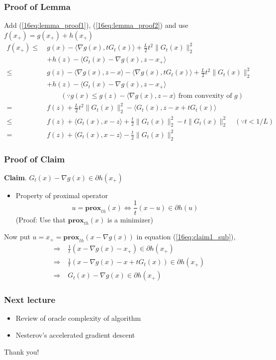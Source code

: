 \documentclass{beamer}
\begin{document}
\begin{frame}
\frametitle{Proof of Lemma}
Add (\ref{16eq:lemma_proof1}), (\ref{16eq:lemma_proof2}) and use $f(x_+)=g(x_+)+h(x_+)$
\begin{align*}
f(x_+) \leq ~&g(x)- \langle \nabla g(x), tG_t(x) \rangle +\frac{L}{2}t^2 \|G_t(x)\|_2^2\\
&+h(z)-\langle G_t(x) -\nabla g(x),z-x_+ \rangle\\
\leq ~&g(z) -\langle \nabla g(x),z-x \rangle - \langle \nabla g(x), tG_t(x) \rangle +\frac{L}{2}t^2 \|G_t(x)\|_2^2\\
&+h(z)-\langle G_t(x) -\nabla g(x),z-x_+ \rangle \\
&\hspace{2em}(\because g(x) \leq g(z)-\langle \nabla g(x),z-x \rangle \text{ from convexity of } g)\\
= ~&f(z)+\frac{L}{2}t^2 \|G_t(x)\|_2^2 - \langle G_t(x),z-x+tG_t(x) \rangle\\
\leq ~&f(z)+\langle G_t (x),x-z \rangle+\frac{t}{2}\|G_t(x)\|_2^2-t \|G_t(x)\|_2^2 \hspace{1em}(\because t<1/L)\\
= ~&f(z)+\langle G_t (x),x-z \rangle-\frac{t}{2}\|G_t(x)\|_2^2
\end{align*}
\end{frame}

\begin{frame}
\frametitle{Proof of Claim}
\textbf{Claim}. $G_t(x)-\nabla g(x) \in \partial h(x_+)$\\
\begin{itemize}
\item Property of proximal operator\\
\begin{equation}\label{16eq:claim1_sub}
u=\textbf{prox}_{th}(x) \Leftrightarrow \frac{1}{t}(x-u) \in \partial h(u)
\end{equation}
(Proof: Use that $\textbf{prox}_{th}(x)$ is a minimizer)
\end{itemize}
\vspace{1em}
Now put $u=x_+ = \textbf{prox}_{th}(x-\nabla g(x))$ in equation (\ref{16eq:claim1_sub}),
\begin{align*}
\Rightarrow ~&\frac{1}{t}(x-\nabla g(x) - x_+) \in \partial h(x_+)\\
\Rightarrow ~&\frac{1}{t}(x-\nabla g(x) - x+tG_t(x)) \in \partial h(x_+)\\
\Rightarrow ~&G_t(x) -\nabla g(x) \in \partial h(x_+)
\end{align*}
\end{frame}

\begin{frame}
\frametitle{Next lecture}
\begin{itemize}
\item Review of oracle complexity of algorithm
\item Nesterov's accelerated gradient descent
\end{itemize}
\vspace{2pc}
\center Thank you!
\end{frame}
\end{document}
